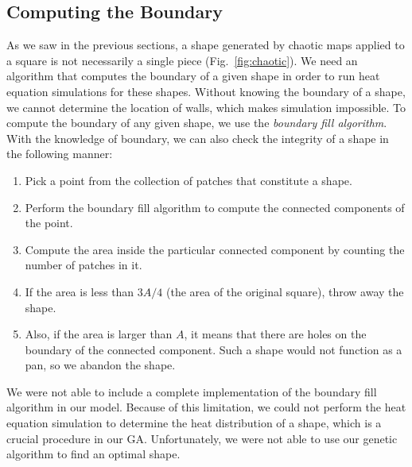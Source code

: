 \documentclass[12pt,draft]{reedmcm}
\begin{document}
\subsection{Computing the Boundary}
As we saw in the previous sections, a shape generated by chaotic maps applied to a square is not necessarily a single piece (Fig.~\ref{fig:chaotic}).
We need an algorithm that computes the boundary of a given shape in order to run heat equation simulations for these shapes.
Without knowing the boundary of a shape, we cannot determine the location of walls, which makes simulation impossible.
To compute the boundary of any given shape, we use the \textit{boundary fill algorithm}.
With the knowledge of boundary, we can also check the integrity of a shape in the following manner:
\begin{enumerate}
  \item Pick a point from the collection of patches that constitute a shape.
  \item Perform the boundary fill algorithm to compute the connected components of the point.
  \item Compute the area inside the particular connected component by counting the number of patches in it.
  \item If the area is less than $3A/4$ (the area of the original square), throw away the shape.
  \item Also, if the area is larger than $A$, it means that there are holes on the boundary of the connected component. Such a shape would not function as a pan, so we abandon the shape.
\end{enumerate}
We were not able to include a complete implementation of the boundary fill algorithm in our model.
Because of this limitation, we could not perform the heat equation simulation to determine the heat distribution of a shape, which is a crucial procedure in our GA.
Unfortunately, we were not able to use our genetic algorithm to find an optimal shape.
\end{document}
